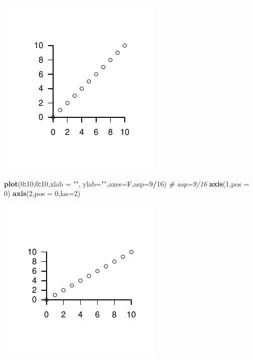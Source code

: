 \documentclass[
  11pt,
]{book}
\newenvironment{Shaded}{\begin{snugshade}}{\end{snugshade}}
\newcommand{\AttributeTok}[1]{\textcolor[rgb]{0.13,0.29,0.53}{#1}}
\newcommand{\CommentTok}[1]{\textcolor[rgb]{0.56,0.35,0.01}{\textit{#1}}}
\newcommand{\DecValTok}[1]{\textcolor[rgb]{0.00,0.00,0.81}{#1}}
\newcommand{\FunctionTok}[1]{\textcolor[rgb]{0.13,0.29,0.53}{\textbf{#1}}}
\newcommand{\NormalTok}[1]{#1}
\newcommand{\SpecialCharTok}[1]{\textcolor[rgb]{0.81,0.36,0.00}{\textbf{#1}}}
\newcommand{\StringTok}[1]{\textcolor[rgb]{0.31,0.60,0.02}{#1}}
\theoremstyle{mytheoremstyle}
\theoremstyle{mydefstyle}
\begin{document}
\begin{center}\includegraphics{Appunti_di_Statistica_2025_files/figure-latex/24-Libro-31-1} \end{center}

\begin{Shaded}
\begin{Highlighting}[]
\FunctionTok{plot}\NormalTok{(}\DecValTok{0}\SpecialCharTok{:}\DecValTok{10}\NormalTok{,}\DecValTok{0}\SpecialCharTok{:}\DecValTok{10}\NormalTok{,}\AttributeTok{xlab =} \StringTok{""}\NormalTok{, }\AttributeTok{ylab=}\StringTok{""}\NormalTok{,}\AttributeTok{axes=}\NormalTok{F,}\AttributeTok{asp=}\DecValTok{9}\SpecialCharTok{/}\DecValTok{16}\NormalTok{) }\CommentTok{\# asp=9/16 }
\FunctionTok{axis}\NormalTok{(}\DecValTok{1}\NormalTok{,}\AttributeTok{pos =} \DecValTok{0}\NormalTok{)}
\FunctionTok{axis}\NormalTok{(}\DecValTok{2}\NormalTok{,}\AttributeTok{pos =} \DecValTok{0}\NormalTok{,}\AttributeTok{las=}\DecValTok{2}\NormalTok{)}
\end{Highlighting}
\end{Shaded}

\begin{center}\includegraphics{Appunti_di_Statistica_2025_files/figure-latex/24-Libro-32-1} \end{center}
\end{document}
